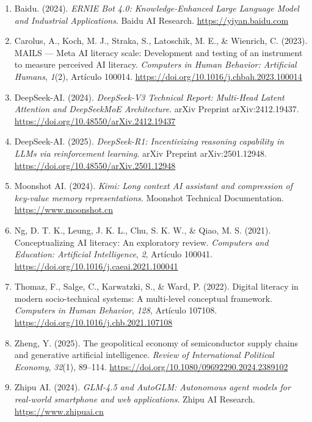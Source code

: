 \begin{enumerate}[leftmargin=1.5em, label={}, itemsep=0.35ex, parsep=0pt]
\small\raggedright
{}
    \item Baidu. (2024). \textit{ERNIE Bot 4.0: Knowledge-Enhanced Large Language Model and Industrial Applications}. Baidu AI Research. \url{https://yiyan.baidu.com}

    \item Carolus, A., Koch, M. J., Straka, S., Latoschik, M. E., \& Wienrich, C. (2023). MAILS --- Meta AI literacy scale: Development and testing of an instrument to measure perceived AI literacy. \textit{Computers in Human Behavior: Artificial Humans}, \textit{1}(2), Artículo 100014. \url{https://doi.org/10.1016/j.chbah.2023.100014}

    \item DeepSeek-AI. (2024). \textit{DeepSeek-V3 Technical Report: Multi-Head Latent Attention and DeepSeekMoE Architecture}. arXiv Preprint arXiv:2412.19437. \url{https://doi.org/10.48550/arXiv.2412.19437}

    \item DeepSeek-AI. (2025). \textit{DeepSeek-R1: Incentivizing reasoning capability in LLMs via reinforcement learning}. arXiv Preprint arXiv:2501.12948. \url{https://doi.org/10.48550/arXiv.2501.12948}

    \item Moonshot AI. (2024). \textit{Kimi: Long context AI assistant and compression of key-value memory representations}. Moonshot Technical Documentation. \url{https://www.moonshot.cn}

    \item Ng, D. T. K., Leung, J. K. L., Chu, S. K. W., \& Qiao, M. S. (2021). Conceptualizing AI literacy: An exploratory review. \textit{Computers and Education: Artificial Intelligence}, \textit{2}, Artículo 100041. \url{https://doi.org/10.1016/j.caeai.2021.100041}

    \item Thomaz, F., Salge, C., Karwatzki, S., \& Ward, P. (2022). Digital literacy in modern socio-technical systems: A multi-level conceptual framework. \textit{Computers in Human Behavior}, \textit{128}, Artículo 107108. \url{https://doi.org/10.1016/j.chb.2021.107108}

    \item Zheng, Y. (2025). The geopolitical economy of semiconductor supply chains and generative artificial intelligence. \textit{Review of International Political Economy}, \textit{32}(1), 89--114. \url{https://doi.org/10.1080/09692290.2024.2389102}

    \item Zhipu AI. (2024). \textit{GLM-4.5 and AutoGLM: Autonomous agent models for real-world smartphone and web applications}. Zhipu AI Research. \url{https://www.zhipuai.cn}
\end{enumerate}
